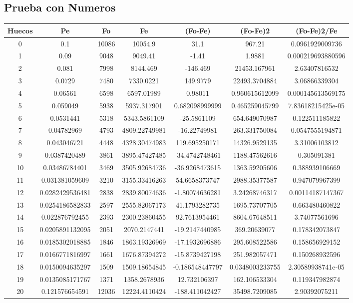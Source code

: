 \documentclass{article}
\begin{document}
\subsection{Prueba con Numeros}
\begin{tabular}{|c|c|c|c|c|c|c|}
Huecos&Pe&Fo&Fe&(Fo{-}Fe)&(Fo{-}Fe)2&(Fo{-}Fe)2/Fe\\
\hline
0&0.1&10086&10054.9&31.1&967.21&0.0961929009736\\
\hline
1&0.09&9048&9049.41&{-}1.41&1.9881&0.000219693880596\\
\hline
2&0.081&7998&8144.469&{-}146.469&21453.167961&2.63407816532\\
\hline
3&0.0729&7480&7330.0221&149.9779&22493.3704884&3.06866339304\\
\hline
4&0.06561&6598&6597.01989&0.98011&0.960615612099&0.000145613569175\\
\hline
5&0.059049&5938&5937.317901&0.682098999999&0.465259045799&7.83618215425e{-}05\\
\hline
6&0.0531441&5318&5343.5861109&{-}25.5861109&654.649070987&0.122511185822\\
\hline
7&0.04782969&4793&4809.22749981&{-}16.22749981&263.331750084&0.0547555194871\\
\hline
8&0.043046721&4448&4328.30474983&119.695250171&14326.9529135&3.31006103812\\
\hline
9&0.0387420489&3861&3895.47427485&{-}34.4742748461&1188.47562616&0.305091381\\
\hline
10&0.03486784401&3469&3505.92684736&{-}36.9268473615&1363.59205606&0.388939106669\\
\hline
11&0.031381059609&3210&3155.33416263&54.6658373747&2988.35377587&0.947079967399\\
\hline
12&0.0282429536481&2838&2839.80074636&{-}1.80074636281&3.24268746317&0.00114187147367\\
\hline
13&0.0254186582833&2597&2555.82067173&41.1793282735&1695.73707705&0.663480460822\\
\hline
14&0.022876792455&2393&2300.23860455&92.7613954461&8604.67648511&3.74077561696\\
\hline
15&0.0205891132095&2051&2070.2147441&{-}19.2147440985&369.20639077&0.178342073847\\
\hline
16&0.0185302018885&1846&1863.19326969&{-}17.1932696886&295.608522586&0.158656929152\\
\hline
17&0.0166771816997&1661&1676.87394272&{-}15.8739427198&251.982057471&0.150268932596\\
\hline
18&0.0150094635297&1509&1509.18654845&{-}0.186548447797&0.0348003233755&2.30589938741e{-}05\\
\hline
19&0.0135085171767&1371&1358.2678936&12.732106397&162.106533304&0.119347982874\\
\hline
20&0.121576654591&12036&12224.4110424&{-}188.411042427&35498.7209085&2.90392075211\\
\end{tabular}
\end{document}
